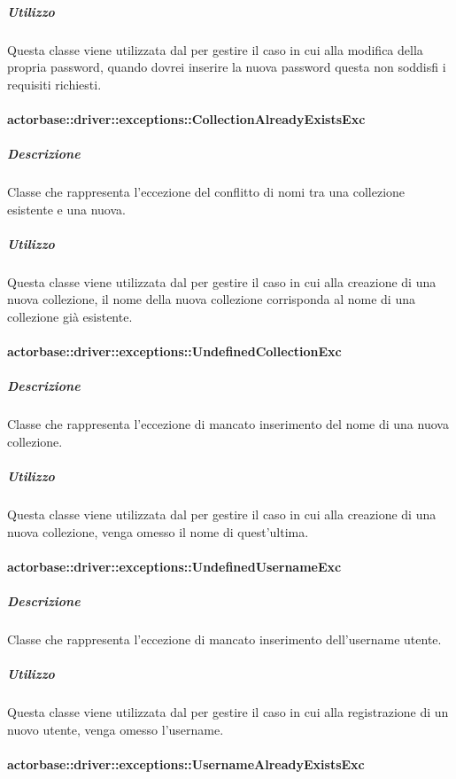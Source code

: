 \documentclass{scalatekids-article}
\begin{document}
\subparagraph{Utilizzo}

Questa classe viene utilizzata dal  per gestire il caso in cui alla modifica della propria password, quando dovrei inserire la nuova password questa non soddisfi i requisiti richiesti.

\paragraph{actorbase::driver::exceptions::CollectionAlreadyExistsExc}

\subparagraph{Descrizione}

Classe che rappresenta l'eccezione del conflitto di nomi tra una collezione esistente e una nuova.

\subparagraph{Utilizzo}

Questa classe viene utilizzata dal  per gestire il caso in cui alla creazione di una nuova collezione, il nome della nuova collezione corrisponda al nome di una collezione già esistente.

\paragraph{actorbase::driver::exceptions::UndefinedCollectionExc}

\subparagraph{Descrizione}

Classe che rappresenta l'eccezione di mancato inserimento del nome di una nuova collezione.

\subparagraph{Utilizzo}

Questa classe viene utilizzata dal  per gestire il caso in cui alla creazione di una nuova collezione, venga omesso il nome di quest'ultima.

\paragraph{actorbase::driver::exceptions::UndefinedUsernameExc}

\subparagraph{Descrizione}

Classe che rappresenta l'eccezione di mancato inserimento dell'username utente.

\subparagraph{Utilizzo}

Questa classe viene utilizzata dal  per gestire il caso in cui alla registrazione di un nuovo utente, venga omesso l'username.

\paragraph{actorbase::driver::exceptions::UsernameAlreadyExistsExc}
\end{document}
